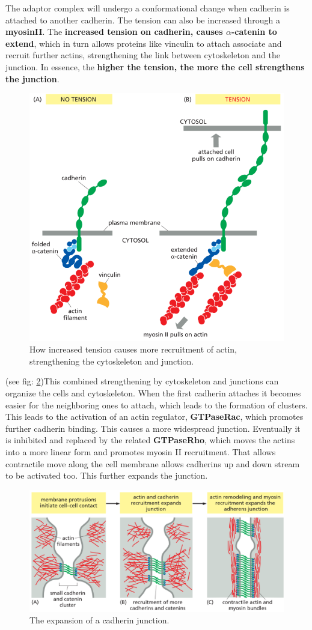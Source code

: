 \documentclass[../main.tex]{subfiles}
\begin{document}
The adaptor complex will undergo a conformational change when cadherin is attached to another cadherin. The tension can also be increased through a \textbf{\gls{myosinII}}. The \textbf{increased tension on cadherin, causes $\alpha$-catenin to extend}, which in turn allows proteins like vinculin to attach associate and recruit further actins, strengthening the link between cytoskeleton and the junction. In essence, the \textbf{higher the tension, the more the cell strengthens the junction}.

\begin{figure}[H]
	\centering
	\includegraphics[width=0.4\linewidth]{cad_tens}
	\caption{How increased tension causes more recruitment of actin, strengthening the cytoskeleton and junction.}
	\label{fig:cadtens}
\end{figure}

(see fig: \ref{fig:cadexpa})This combined strengthening by cytoskeleton and junctions can organize the cells and cytoskeleton. When the first cadherin attaches it becomes easier for the neighboring ones to attach, which leads to the formation of clusters. This leads to the activation of an actin regulator, \textbf{\gls{GTPaseRac}}, which promotes further cadherin binding. This causes a more widespread junction. Eventually it is inhibited and replaced by the related \textbf{\gls{GTPaseRho}}, which moves the actins into a more linear form and promotes myosin II recruitment. That allows contractile move along the cell membrane allows cadherins up and down stream to be activated too. This further expands the junction.

\begin{figure}[H]
	\centering
	\includegraphics[width=0.6\linewidth]{cad_expa}
	\caption{The expansion of a cadherin junction.}
	\label{fig:cadexpa}
\end{figure}
\end{document}
